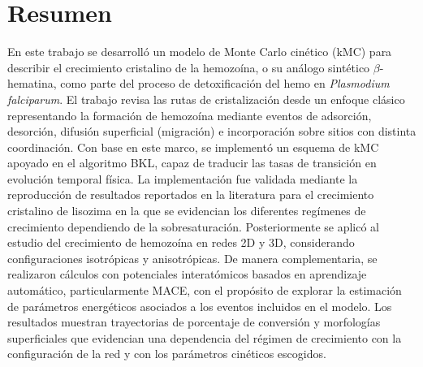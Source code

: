 \documentclass[12pt,letterpaper,oneside]{report}
\begin{document}
\newpage
\chapter*{Resumen}

En este trabajo se desarrolló un modelo de Monte Carlo cinético (kMC) para describir el crecimiento cristalino de la hemozoína, o su análogo sintético $\beta$-hematina, como parte del proceso de detoxificación del hemo en \textit{Plasmodium falciparum}.  El trabajo revisa las rutas de cristalización desde un enfoque   clásico representando la formación de hemozoína mediante eventos de adsorción, desorción, difusión superficial (migración) e incorporación sobre sitios con distinta coordinación. Con base en este marco, se implementó un esquema de kMC apoyado en el algoritmo BKL, capaz de traducir las tasas de transición en evolución temporal física. La implementación fue validada mediante la reproducción de resultados reportados en la literatura para el crecimiento cristalino de lisozima en la que se evidencian los diferentes regímenes de crecimiento dependiendo de la sobresaturación. Posteriormente se aplicó al estudio del crecimiento de hemozoína en redes 2D y 3D, considerando configuraciones isotrópicas y anisotrópicas. De manera complementaria, se realizaron cálculos con potenciales interatómicos basados en aprendizaje automático, particularmente MACE, con el propósito de explorar la estimación de parámetros energéticos asociados a los eventos incluidos en el modelo. Los resultados muestran trayectorias de porcentaje de conversión y morfologías superficiales que evidencian una dependencia del régimen de crecimiento con la configuración de la red y con los parámetros cinéticos escogidos.

\end{document}

